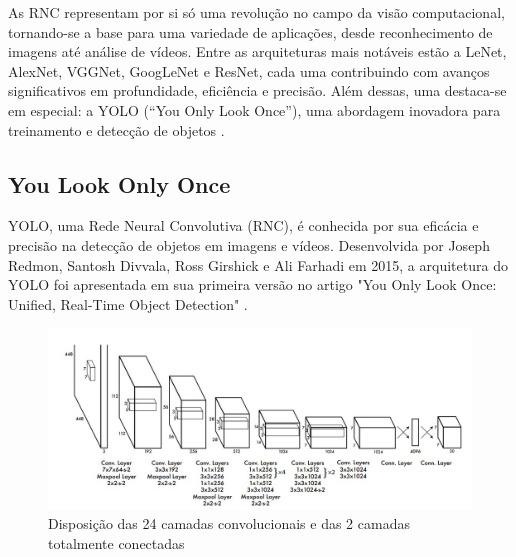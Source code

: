 As RNC representam por si só uma revolução no campo da visão computacional, tornando-se a base para uma variedade de aplicações, desde reconhecimento de imagens até análise de vídeos. Entre as arquiteturas mais notáveis estão a LeNet, AlexNet, VGGNet, GoogLeNet e ResNet, cada uma contribuindo com avanços significativos em profundidade, eficiência e precisão. Além dessas, uma destaca-se em especial: a YOLO (“You Only Look Once”), uma abordagem inovadora para treinamento e detecção de objetos \cite{carboni2021sistema}.

\subsection{You Look Only Once}
\label{sec:yolo}

YOLO, uma Rede Neural Convolutiva (RNC), é conhecida por sua eficácia e precisão na detecção de objetos em imagens e vídeos. Desenvolvida por Joseph Redmon, Santosh Divvala, Ross Girshick e Ali Farhadi em 2015, a arquitetura do YOLO foi apresentada em sua primeira versão no artigo "You Only Look Once: Unified, Real-Time Object Detection" \cite{redmon2016youlookonce}.
\begin{figure}[!h]
    \center
    \begin{minipage}{0.9\linewidth}
    \center
    \captionsetup{justification=centering,margin=0.5cm,font=small}
    \includegraphics[width=0.7\linewidth]{img/cap2/RNC-YOLO.jpeg}
    \caption{ Disposição das 24 camadas convolucionais e das 2 camadas totalmente conectadas \cite{redmon2016youlookonce}} \label{fig:rnc-yolo}
    \end{minipage}
\end{figure}

